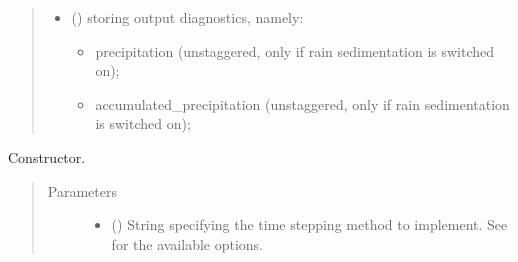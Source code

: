 \documentclass[letterpaper,10pt,english]{sphinxmanual}
\begin{document}
\begin{fulllineitems}
\begin{fulllineitems}
\begin{quote}
\begin{description}
\begin{itemize}
\begin{itemize}
\end{itemize}

\item {} 
 () \textendash{} {\hyperref[\detokenize{api:tasmania.storages.grid_data.GridData}]{}} storing output diagnostics, namely:
\begin{itemize}
\item {} 
precipitation (unstaggered, only if rain sedimentation is switched on);

\item {} 
accumulated\_precipitation (unstaggered, only if rain sedimentation is switched on);

\end{itemize}

\end{itemize}


\end{description}\end{quote}

\end{fulllineitems}


\begin{fulllineitems}
\label{\detokenize{api:tasmania.dycore.dycore_isentropic.DynamicalCoreIsentropic.__init__}}
Constructor.
\begin{quote}\begin{description}
\item[{Parameters}] \leavevmode\begin{itemize}
\item {} 
 () \textendash{} String specifying the time stepping method to implement.
See {\hyperref[\detokenize{api:tasmania.dycore.prognostic_isentropic.PrognosticIsentropic}]{}} for the available options.


\end{itemize}
\end{description}
\end{quote}
\end{fulllineitems}
\end{fulllineitems}
\end{document}
